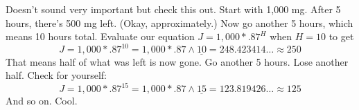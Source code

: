 Doesn't sound very important but check this out.  Start with 1,000 mg.  After 5 hours, there's 500 mg left.  (Okay, approximately.)  Now go another 5 hours, which means 10 hours total.  Evaluate our equation $J = 1,000 \ast .87^H$ when $H =10$ to get
 $$ J = 1,000 \ast .87^{10} = 1,000 \ast .87 \wedge \underline{10} = 248.423414\ldots \approx 250$$ 
That means half of what was left is now gone.  Go another 5 hours. Lose another half. Check for yourself:
$$ J = 1,000 \ast .87^{15} = 1,000 \ast .87 \wedge \underline{15} = 123.819426\ldots \approx 125$$ 
And so on.  Cool.


%